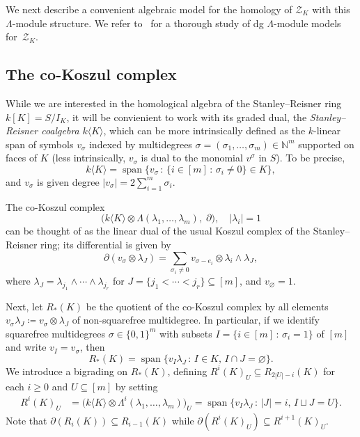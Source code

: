 \documentclass[a4paper,10pt]{amsart}
\theoremstyle{definition}
\theoremstyle{remark}
\begin{document}
We next describe a convenient algebraic model for the homology of $\mathcal{Z}_K$ with this $\Lambda$-module structure. We refer to~\cite[Section~3]{AB} for a thorough study of dg $\Lambda$-module models for~$\mathcal{Z}_K$.

\subsection*{The co-Koszul complex} While we are interested in the homological algebra of the Stanley--Reisner ring $k[K]=S/I_K$, it will be convienient to work with its graded dual, the \emph{Stanley--Reisner coalgebra} $k\langle K\rangle$, which can be more intrinsically defined as the $k$-linear span of symbols $v_\sigma$ indexed by multidegrees $\sigma=(\sigma_1,\ldots,\sigma_m)\in\mathbb{N}^m$ supported on faces of $K$ (less intrinsically, $v_\sigma $ is dual to the monomial $v^\sigma$ in $S$). To be precise,
\[
k\langle K\rangle = \operatorname{span}\Big\{v_\sigma\,:\, \{i\in [m] \,:\, \sigma_i\neq 0\}\in K\Big\},
\]
and $v_\sigma$ is given degree $|v_\sigma|=2\sum_{i=1}^m\sigma_i$.

The co-Koszul complex
\[
\big( k\langle K\rangle \otimes \Lambda(\lambda_1,\ldots,\lambda_m),\; \partial \big), \quad |\lambda_i|=1
\]
can be thought of as the linear dual of the usual Koszul complex of the Stanley--Reisner ring; its differential is given by
\[ 
\partial(v_\sigma\otimes \lambda_J) = \sum_{\sigma_i\neq 0}v_{\sigma-e_i}\otimes \lambda_i\wedge \lambda_J,
\]
where $\lambda_J=\lambda_{j_1}\wedge\cdots\wedge \lambda_{j_r}$ for $J=\{j_1<\cdots <j_r\}\subseteq [m]$, and $v_\varnothing=1$. 

Next, let $R_*(K)$ be the quotient of the co-Koszul complex by all elements $v_\sigma \lambda_J \coloneqq v_\sigma \otimes \lambda_J$ of non-squarefree multidegree. In particular, if we identify squarefree multidegrees $\sigma\in\{0,1\}^m$ with subsets $I=\{i\in [m] \,:\, \sigma_i=1\}$ of $[m]$ and write  $v_I=v_\sigma$, then
\[
R_*(K) = \operatorname{span}\{ v_I\lambda_J \,:\, I\in K,\, I\cap J=\varnothing \}.
\]
We introduce a bigrading on $R_*(K)$, defining $R^i(K)_U \subseteq R_{2|U|-i}(K)$ for each $i\geqslant 0$ and $U\subseteq [m]$ by setting
\begin{align*}
R^i(K)_U &= \big( k\langle K\rangle \otimes \Lambda^i(\lambda_1,\ldots,\lambda_m) \big)_U =\operatorname{span}\{ v_I\lambda_J \,:\, |J|=i,\, I\sqcup J=U \}.
\end{align*}
Note that $\partial(R_i(K))\subseteq R_{i-1}(K)$ while  $\partial(R^i(K)_U) \subseteq R^{i+1}(K)_U$.
\end{document}
